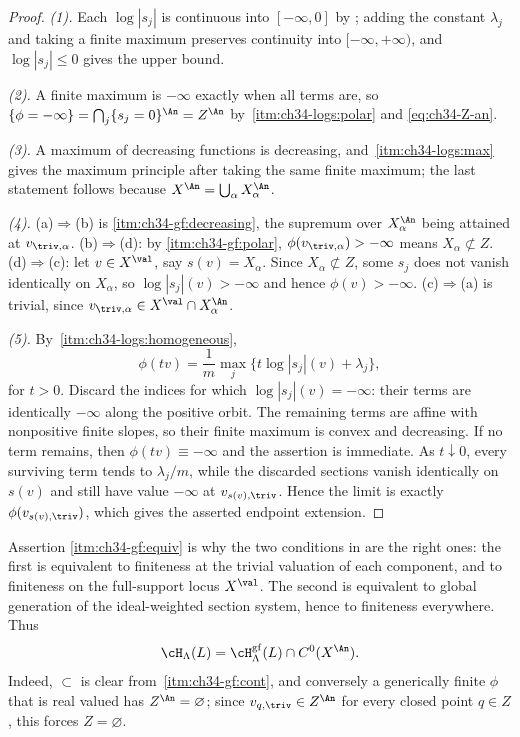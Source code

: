 \begin{proof}
\emph{(1).}  Each $\log|s_j|$ is continuous into
$[-\infty,0]$ by ; adding the constant
$\lambda_j$ and taking a finite maximum preserves continuity into
$[-\infty,+\infty)$, and $\log|s_j|\le0$ gives the upper bound.

\emph{(2).}  A finite maximum is $-\infty$ exactly
when all terms are, so
$\{\phi=-\infty\}=\bigcap_j\{s_j=0\}^{\An}=Z^{\An}$ by
\,\cref{itm:ch34-logs:polar} and
\eqref{eq:ch34-Z-an}.

\emph{(3).}  A maximum of decreasing functions
is decreasing, and \,\cref{itm:ch34-logs:max}
gives the maximum principle after taking the same finite maximum; the last
statement follows because $X^{\An}=\bigcup_\alpha X_\alpha^{\An}$.

\emph{(4).}  (a)$\Rightarrow$(b) is
\cref{itm:ch34-gf:decreasing}, the supremum over $X_\alpha^{\An}$ being
attained at $v_{\triv,\alpha}$.  (b)$\Rightarrow$(d): by
\cref{itm:ch34-gf:polar}, $\phi(v_{\triv,\alpha})>-\infty$ means
$X_\alpha\not\subset Z$.  (d)$\Rightarrow$(c): let $v\in X^{\val}$,
say $s(v)=X_\alpha$.  Since $X_\alpha\not\subset Z$, some $s_j$ does
not vanish identically on $X_\alpha$, so
$\log|s_j|(v)>-\infty$ and hence $\phi(v)>-\infty$.
(c)$\Rightarrow$(a) is trivial, since
$v_{\triv,\alpha}\in X^{\val}\cap X_\alpha^{\An}$.

\emph{(5).}  By
\,\cref{itm:ch34-logs:homogeneous},
\[
 \phi(tv)=\frac1m\max_j\{t\log|s_j|(v)+\lambda_j\},
\]
for $t>0$.  Discard the indices for which
$\log|s_j|(v)=-\infty$: their terms are identically $-\infty$ along the
positive orbit.  The remaining terms are affine with nonpositive finite
slopes, so their finite maximum is convex and decreasing.  If no term
remains, then $\phi(tv)\equiv-\infty$ and the assertion is immediate.
As $t\downarrow0$, every surviving term tends to $\lambda_j/m$, while
the discarded sections vanish identically on $s(v)$ and still have value
$-\infty$ at $v_{s(v),\triv}$.  Hence the limit is exactly
$\phi(v_{s(v),\triv})$, which gives the asserted endpoint extension.
\end{proof}

Assertion \cref{itm:ch34-gf:equiv} is why the two conditions in
 are the right ones: the first is equivalent to
finiteness at the trivial valuation of each component, and to finiteness on
the full-support locus $X^{\val}$.  The second is equivalent to global
generation of the ideal-weighted section system, hence to finiteness
everywhere.  Thus
\begin{equation}
\label{eq:fs-gf-continuous-intersection}
 \cH_\Lambda(L)=
 \cH^{\mathrm{gf}}_\Lambda(L)\cap C^0(X^{\An}).
\end{equation}
Indeed, $\subset$ is clear from
\,\cref{itm:ch34-gf:cont}, and
conversely a generically finite $\phi$ that is real valued has
$Z^{\An}=\varnothing$; since $v_{q,\triv}\in Z^{\An}$ for every closed
point $q\in Z$, this forces $Z=\varnothing$.

